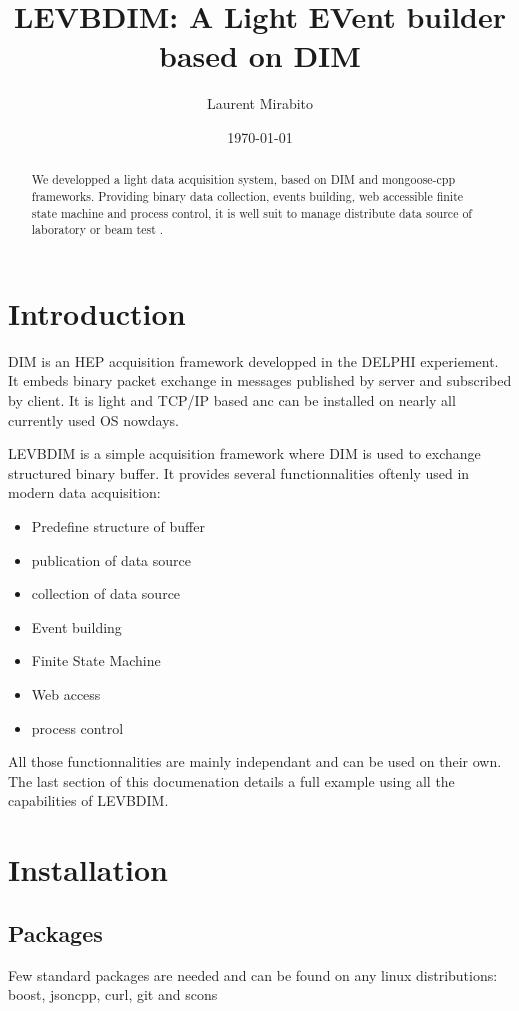 \documentclass[11pt]{article}
\title{\textbf{LEVBDIM: A Light EVent builder based on DIM}}
\author{Laurent Mirabito\\
		}
\date{\today}
\begin{document}
\maketitle
\begin{abstract}
 We developped a light data acquisition system, based on DIM \cite{dim} and mongoose-cpp \cite{mongoose-cpp} frameworks. Providing binary data collection, events building, web accessible finite state machine and process control, it is well suit to manage distribute data source of laboratory or beam test .
\end{abstract}
\section{Introduction}

DIM\cite{dim} is an HEP acquisition framework developped in the DELPHI experiement. It embeds binary packet exchange in messages published by server and subscribed by client. It is light and TCP/IP based anc can be installed on nearly all currently used OS nowdays.

LEVBDIM is a simple acquisition framework where DIM is used to exchange structured binary buffer. It provides several functionnalities oftenly used in modern data acquisition:

\begin{itemize}
    \item Predefine structure of buffer
    \item publication of data source
    \item collection of data source
    \item Event building
    \item Finite State Machine
    \item Web access
    \item process control
\end{itemize}
All those functionnalities are mainly independant and can be used on their own. The last section of this documenation details a full example using all the capabilities of LEVBDIM.

\section{Installation}
\subsection{Packages}
Few standard packages are needed and can be found on any linux distributions: boost, jsoncpp, curl, git and scons
\end{document}
